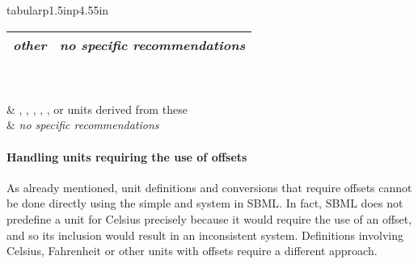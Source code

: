 \begin{table}[thb]
\begin{edtable}{tabular}{p{1.5in}p{4.55in}}
\begin{minipage}{4.555in}
\begin{tabular}{@{}cp{3.2in}@{}}
        \\[5pt] 
        \emph{other}
        &
        \emph{no specific recommendations}\\
        \bottomrule
      \end{tabular}
    \end{minipage}
    \\
    \\
    \Species {}
    &
    , ,
    , , , or units
    derived from these
    \\[9pt]
    \Parameter {}
    &
    \emph{no specific recommendations}
    \\
    \bottomrule
  \end{edtable}
  \label{tab:recommended-units}
\end{table}


\paragraph{Handling units requiring the use of offsets}
\label{sec:bp:unitdefinitions:offset}

As already mentioned, unit definitions and conversions that
require offsets cannot be done directly using the simple
\UnitDefinition and \Unit system in SBML.  In fact, SBML does not
predefine a unit for Celsius precisely because it would require
the use of an offset, and so its inclusion would result in an
inconsistent system.  Definitions involving Celsius, Fahrenheit or
other units with offsets require a different approach.


